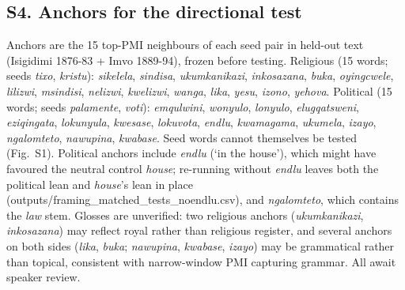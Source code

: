 \documentclass[10pt,letterpaper]{article}
\begin{document}
\subsection*{S4. Anchors for the directional test}
Anchors are the 15 top-PMI neighbours of each seed pair in held-out text (Isigidimi 1876-83 + Imvo 1889-94), frozen before testing. Religious (15 words; seeds \emph{tixo}, \emph{kristu}): \emph{sikelela}, \emph{sindisa}, \emph{ukumkanikazi}, \emph{inkosazana}, \emph{buka}, \emph{oyingcwele}, \emph{lilizwi}, \emph{msindisi}, \emph{nelizwi}, \emph{kwelizwi}, \emph{wanga}, \emph{lika}, \emph{yesu}, \emph{izono}, \emph{yehova}. Political (15 words; seeds \emph{palamente}, \emph{voti}): \emph{emqulwini}, \emph{wonyulo}, \emph{lonyulo}, \emph{elugqatsweni}, \emph{eziqingata}, \emph{lokunyula}, \emph{kwesase}, \emph{lokuvota}, \emph{endlu}, \emph{kwamagama}, \emph{ukumela}, \emph{izayo}, \emph{ngalomteto}, \emph{nawupina}, \emph{kwabase}. Seed words cannot themselves be tested (Fig.~S1). Political anchors include \emph{endlu} (`in the house'), which might have favoured the neutral control \emph{house}; re-running without \emph{endlu} leaves both the political lean and \emph{house}'s lean in place (outputs/framing\_matched\_tests\_noendlu.csv), and \emph{ngalomteto}, which contains the \emph{law} stem. Glosses are unverified: two religious anchors (\emph{ukumkanikazi}, \emph{inkosazana}) may reflect royal rather than religious register, and several anchors on both sides (\emph{lika}, \emph{buka}; \emph{nawupina}, \emph{kwabase}, \emph{izayo}) may be grammatical rather than topical, consistent with narrow-window PMI capturing grammar. All await speaker review.
\normalsize
\end{document}
